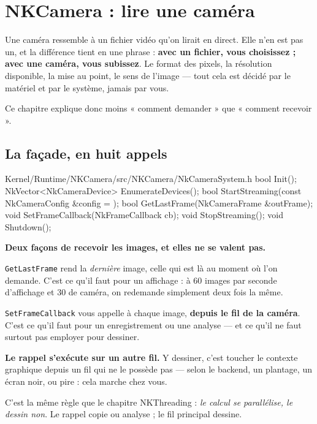 \chapter{NKCamera : lire une caméra}

Une caméra ressemble à un fichier vidéo qu'on lirait en direct. Elle n'en est pas
un, et la différence tient en une phrase : \textbf{avec un fichier, vous
choisissez ; avec une caméra, vous subissez}. Le format des pixels, la
résolution disponible, la mise au point, le sens de l'image --- tout cela est
décidé par le matériel et par le système, jamais par vous.

Ce chapitre explique donc moins « comment demander » que « comment recevoir ».

\section{La façade, en huit appels}

\begin{nkcode}{Kernel/Runtime/NKCamera/src/NKCamera/NkCameraSystem.h}
bool Init();
NkVector<NkCameraDevice> EnumerateDevices();
bool StartStreaming(const NkCameraConfig &config = {});
bool GetLastFrame(NkCameraFrame &outFrame);
void SetFrameCallback(NkFrameCallback cb);
void StopStreaming();
void Shutdown();
\end{nkcode}

\begin{nkretenir}
\textbf{Deux façons de recevoir les images, et elles ne se valent pas.}

\texttt{GetLastFrame} rend la \emph{dernière} image, celle qui est là au moment
où l'on demande. C'est ce qu'il faut pour un affichage : à 60 images par seconde
d'affichage et 30 de caméra, on redemande simplement deux fois la même.

\texttt{SetFrameCallback} vous appelle à chaque image, \textbf{depuis le fil de
la caméra}. C'est ce qu'il faut pour un enregistrement ou une analyse --- et ce
qu'il ne faut surtout pas employer pour dessiner.
\end{nkretenir}

\begin{nkpiege}
\textbf{Le rappel s'exécute sur un autre fil.} Y dessiner, c'est toucher le
contexte graphique depuis un fil qui ne le possède pas --- selon le backend, un
plantage, un écran noir, ou pire : cela marche chez vous.

C'est la même règle que le chapitre NKThreading : \emph{le calcul se
parallélise, le dessin non}. Le rappel copie ou analyse ; le fil principal
dessine.
\end{nkpiege}

